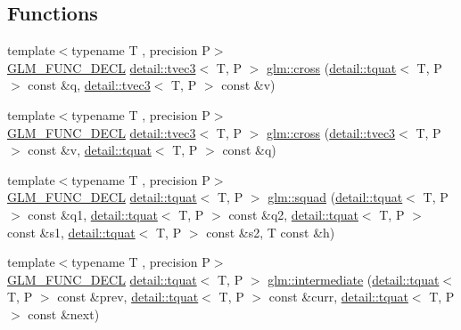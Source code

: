 \subsection*{Functions}
\begin{DoxyCompactItemize}
\item 
{\footnotesize template$<$typename T , precision P$>$ }\\\hyperlink{setup_8hpp_ab2d052de21a70539923e9bcbf6e83a51}{G\+L\+M\+\_\+\+F\+U\+N\+C\+\_\+\+D\+E\+CL} \hyperlink{structglm_1_1detail_1_1tvec3}{detail\+::tvec3}$<$ T, P $>$ \hyperlink{group__gtx__quaternion_ga8b5c3ff869c773f26d0a562dfcd3f9e4}{glm\+::cross} (\hyperlink{structglm_1_1detail_1_1tquat}{detail\+::tquat}$<$ T, P $>$ const \&q, \hyperlink{structglm_1_1detail_1_1tvec3}{detail\+::tvec3}$<$ T, P $>$ const \&v)
\item 
{\footnotesize template$<$typename T , precision P$>$ }\\\hyperlink{setup_8hpp_ab2d052de21a70539923e9bcbf6e83a51}{G\+L\+M\+\_\+\+F\+U\+N\+C\+\_\+\+D\+E\+CL} \hyperlink{structglm_1_1detail_1_1tvec3}{detail\+::tvec3}$<$ T, P $>$ \hyperlink{group__gtx__quaternion_ga7794f940ba271ff846ea706204b0259a}{glm\+::cross} (\hyperlink{structglm_1_1detail_1_1tvec3}{detail\+::tvec3}$<$ T, P $>$ const \&v, \hyperlink{structglm_1_1detail_1_1tquat}{detail\+::tquat}$<$ T, P $>$ const \&q)
\item 
{\footnotesize template$<$typename T , precision P$>$ }\\\hyperlink{setup_8hpp_ab2d052de21a70539923e9bcbf6e83a51}{G\+L\+M\+\_\+\+F\+U\+N\+C\+\_\+\+D\+E\+CL} \hyperlink{structglm_1_1detail_1_1tquat}{detail\+::tquat}$<$ T, P $>$ \hyperlink{group__gtx__quaternion_ga5e756a5817856a3d69f0974fac8322e2}{glm\+::squad} (\hyperlink{structglm_1_1detail_1_1tquat}{detail\+::tquat}$<$ T, P $>$ const \&q1, \hyperlink{structglm_1_1detail_1_1tquat}{detail\+::tquat}$<$ T, P $>$ const \&q2, \hyperlink{structglm_1_1detail_1_1tquat}{detail\+::tquat}$<$ T, P $>$ const \&s1, \hyperlink{structglm_1_1detail_1_1tquat}{detail\+::tquat}$<$ T, P $>$ const \&s2, T const \&h)
\item 
{\footnotesize template$<$typename T , precision P$>$ }\\\hyperlink{setup_8hpp_ab2d052de21a70539923e9bcbf6e83a51}{G\+L\+M\+\_\+\+F\+U\+N\+C\+\_\+\+D\+E\+CL} \hyperlink{structglm_1_1detail_1_1tquat}{detail\+::tquat}$<$ T, P $>$ \hyperlink{group__gtx__quaternion_ga96cb50103d939ea50d8b80bc898b2a35}{glm\+::intermediate} (\hyperlink{structglm_1_1detail_1_1tquat}{detail\+::tquat}$<$ T, P $>$ const \&prev, \hyperlink{structglm_1_1detail_1_1tquat}{detail\+::tquat}$<$ T, P $>$ const \&curr, \hyperlink{structglm_1_1detail_1_1tquat}{detail\+::tquat}$<$ T, P $>$ const \&next)

\end{DoxyCompactItemize}
